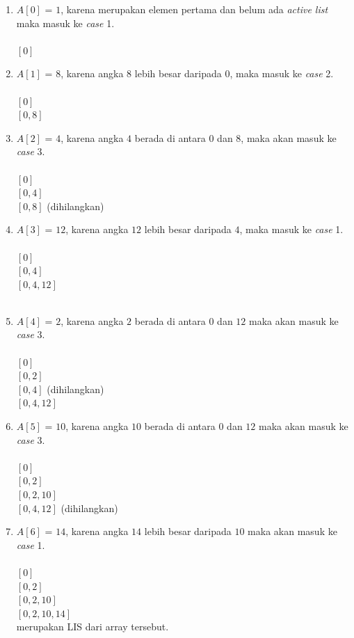 \begin{enumerate}
	\item $A[0]$ = $1$, karena merupakan elemen pertama dan belum ada \textit{active list} maka masuk ke \textit{case} 1.\\\\
	$[0]$\\
	\item $A[1]$ = $8$, karena angka $8$ lebih besar daripada $0$, maka masuk ke \textit{case} 2.\\\\
	$[0]$\\
	$[0,8]$\\
	\item $A[2]$ = $4$, karena angka $4$ berada di antara $0$ dan $8$, maka akan masuk ke \textit{case} 3.\\\\
	$[0]$\\
	$[0,4]$\\
	\sout{$[0,8]$} (dihilangkan)\\
	\item $A[3]$ = $12$, karena angka $12$ lebih besar daripada $4$, maka masuk ke \textit{case} 1.\\\\
	$[0]$\\
	$[0,4]$\\
	$[0,4,12]$\\\\
	\item $A[4]$ = $2$, karena angka $2$ berada di antara $0$ dan $12$ maka akan masuk ke \textit{case} 3.\\\\
	$[0]$\\
	$[0,2]$\\
	\sout{$[0,4]$} (dihilangkan)\\
	$[0,4,12]$\\
	\item $A[5]$ = $10$, karena angka $10$ berada di antara $0$ dan $12$ maka akan masuk ke \textit{case} 3.\\\\
	$[0]$\\
	$[0,2]$\\
	$[0,2,10]$\\
	\sout{$[0,4,12]$} (dihilangkan)\\
	\item $A[6]$ = $14$, karena angka $14$ lebih besar daripada $10$ maka akan masuk ke \textit{case} 1.\\\\
	$[0]$\\
	$[0,2]$\\
	$[0,2,10]$\\
	$[0,2,10,14]$\\ merupakan LIS dari array tersebut.
\end{enumerate}

